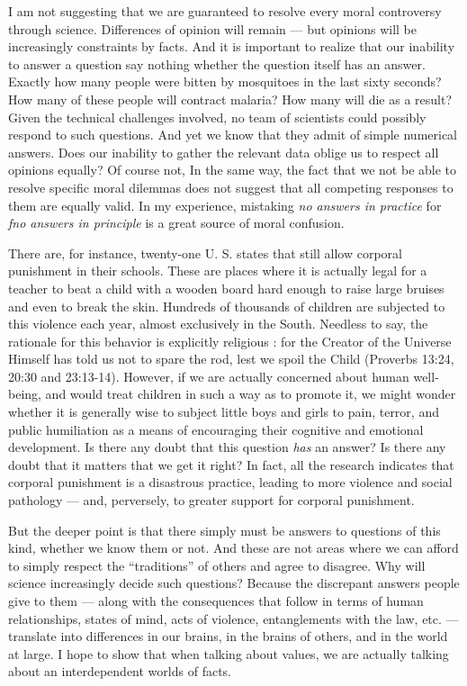 \documentclass[a4paper,14pt]{extbook}
\begin{document}
I am not suggesting that we are guaranteed to resolve every moral controversy through science.
Differences of opinion will remain --- but opinions will be increasingly constraints by facts.
And it is important to realize that our inability to answer a question say nothing whether the question itself has an answer.
Exactly how many people were bitten by mosquitoes in the last sixty seconds?
How many of these people will contract malaria?
How many will die as a result?
Given the technical challenges involved, no team of scientists could possibly respond to such questions.
And yet we know that they admit of simple numerical answers.
Does our inability to gather the relevant data oblige us to respect all opinions equally?
Of course not,
In the same way, the fact that we not be able to resolve specific moral dilemmas does not suggest that all competing responses to them are equally valid.
In my experience, mistaking \textit{no answers in practice} for \textit{fno answers in principle} is a great source of moral confusion.

There are, for instance, twenty-one U. S. states that still allow corporal punishment in their schools.
These are places where it is actually legal for a teacher to beat a child with a wooden board hard enough to raise large bruises and even to break the skin.
Hundreds of thousands of children are subjected to this violence each year, almost exclusively in the South.
Needless to say, the rationale for this behavior is explicitly religious :
for the Creator of the Universe Himself has told us not to spare the rod, lest we spoil the Child (Proverbs 13:24, 20:30 and 23:13-14).
However, if we are actually concerned about human well-being, and would treat children in such a way as to promote it, we might wonder whether it is generally wise to subject little boys and girls to pain, terror, and public humiliation as a means of encouraging their cognitive and emotional development.
Is there any doubt that this question \textit{has} an answer?
Is there any doubt that it matters that we get it right?
In fact, all the research indicates that corporal punishment is a disastrous practice, leading to more violence and social pathology --- and, perversely, to greater support for corporal punishment.

But the deeper point is that there simply must be answers to questions of this kind, whether we know them or not.
And these are not areas where we can afford to simply respect the ``traditions'' of others and agree to disagree.
Why will science increasingly decide such questions?
Because the discrepant answers people give to them --- along with the consequences that follow in terms of human relationships, states of mind, acts of violence, entanglements with the law, etc. --- translate into differences in our brains, in the brains of others, and in the world at large.
I hope to show that when talking about values, we are actually talking about an interdependent worlds of facts.
\end{document}
